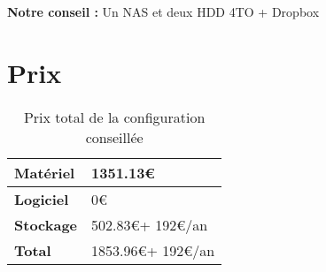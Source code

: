 \textbf{Notre conseil :} Un NAS et deux HDD 4TO + Dropbox

\section{Prix}

\begin{table}[ht]
	\centering
	\begin{tabularx}{\textwidth}{|C|X|}
		\hline
		\textbf{Matériel} & 1351.13\euro \\
		\hline
		\textbf{Logiciel} & 0\euro \\
		\hline
		\textbf{Stockage} & 502.83\euro + 192\euro/an \\
		\hline
		\hline
		\textbf{Total} & 1853.96\euro + 192\euro/an \\
		\hline		
	\end{tabularx}
	\caption{Prix total de la configuration conseillée}
	\label{tab:prix}
\end{table}